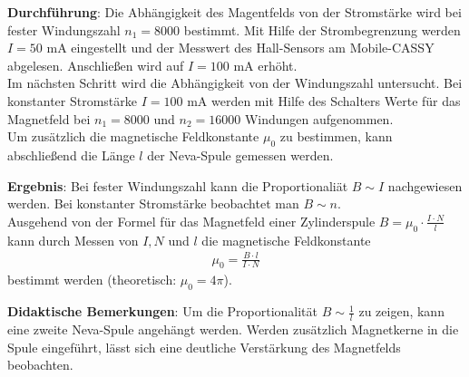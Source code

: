 \documentclass[../main.tex]{subfiles}
\begin{document}
\begin{tcolorbox}
    \vspace{0.5cm}
    \textbf{Durchführung}: Die Abhängigkeit des Magentfelds von der Stromstärke wird bei fester Windungszahl $n_1=8000$ bestimmt. Mit Hilfe der Strombegrenzung werden $I=50$ mA eingestellt und der Messwert des Hall-Sensors am Mobile-CASSY abgelesen. Anschließen wird auf $I=100$ mA erhöht.\\
    Im nächsten Schritt wird die Abhängigkeit von der Windungszahl untersucht. Bei konstanter Stromstärke $I=100$ mA werden mit Hilfe des Schalters Werte für das Magnetfeld bei $n_1=8000$ und $n_2=16000$ Windungen aufgenommen.\\
    Um zusätzlich die magnetische Feldkonstante $\mu_0$ zu bestimmen, kann abschließend die Länge $l$ der Neva-Spule gemessen werden.

    \vspace{0.5cm}
    \textbf{Ergebnis}: Bei fester Windungszahl kann die Proportionaliät $B \sim I$ nachgewiesen werden. Bei konstanter Stromstärke beobachtet man $B \sim n$.\\
    Ausgehend von der Formel für das Magnetfeld einer Zylinderspule $B=\mu_0 \cdot \frac{I \cdot N}{l}$ kann durch Messen von $I,N$ und $l$ die magnetische Feldkonstante 
    \begin{align*}
        \mu_0 = \frac{B \cdot l}{I \cdot N}
    \end{align*}
    bestimmt werden (theoretisch: $\mu_0=4\pi$).

    \vspace{0.5cm}
    \textbf{Didaktische Bemerkungen}: Um die Proportionalität $B \sim \frac{1}{l}$ zu zeigen, kann eine zweite Neva-Spule angehängt werden. Werden zusätzlich Magnetkerne in die Spule eingeführt, lässt sich eine deutliche Verstärkung des Magnetfelds beobachten.


\end{tcolorbox}
\end{document}
